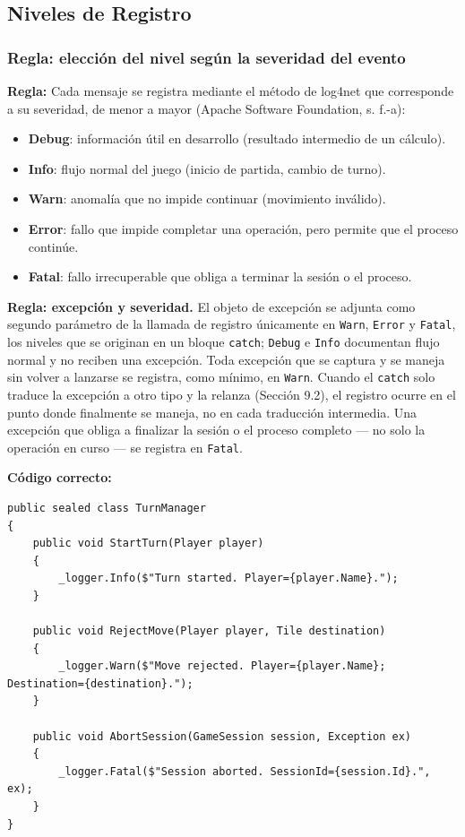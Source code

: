 \subsection{Niveles de Registro}

\subsubsection{Regla: elección del nivel según la severidad del evento}

\textbf{Regla:} Cada mensaje se registra mediante el método de log4net que corresponde a su severidad, de menor a mayor (Apache Software Foundation, s. f.-a):

\begin{itemize}
  \item \textbf{Debug}: información útil en desarrollo (resultado intermedio de un cálculo).
  \item \textbf{Info}: flujo normal del juego (inicio de partida, cambio de turno).
  \item \textbf{Warn}: anomalía que no impide continuar (movimiento inválido).
  \item \textbf{Error}: fallo que impide completar una operación, pero permite que el proceso continúe.
  \item \textbf{Fatal}: fallo irrecuperable que obliga a terminar la sesión o el proceso.
\end{itemize}

\textbf{Regla: excepción y severidad.} El objeto de excepción se adjunta como segundo parámetro de la llamada de registro únicamente en \texttt{Warn}, \texttt{Error} y \texttt{Fatal}, los niveles que se originan en un bloque \texttt{catch}; \texttt{Debug} e \texttt{Info} documentan flujo normal y no reciben una excepción. Toda excepción que se captura y se maneja sin volver a lanzarse se registra, como mínimo, en \texttt{Warn}. Cuando el \texttt{catch} solo traduce la excepción a otro tipo y la relanza (Sección 9.2), el registro ocurre en el punto donde finalmente se maneja, no en cada traducción intermedia. Una excepción que obliga a finalizar la sesión o el proceso completo --- no solo la operación en curso --- se registra en \texttt{Fatal}.

\textbf{Código correcto:}
\begin{lstlisting}[style=csharpstyle]
public sealed class TurnManager
{
    public void StartTurn(Player player)
    {
        _logger.Info($"Turn started. Player={player.Name}.");
    }

    public void RejectMove(Player player, Tile destination)
    {
        _logger.Warn($"Move rejected. Player={player.Name}; Destination={destination}.");
    }

    public void AbortSession(GameSession session, Exception ex)
    {
        _logger.Fatal($"Session aborted. SessionId={session.Id}.", ex);
    }
}
\end{lstlisting}

